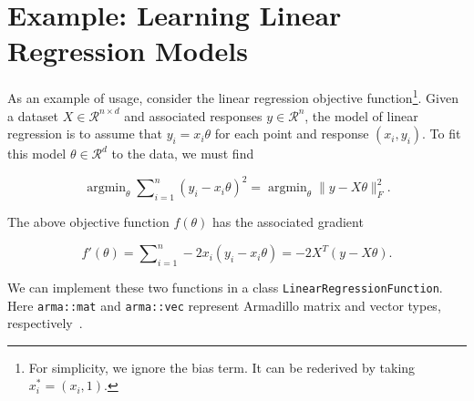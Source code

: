 \documentclass{article}
\begin{document}
\vspace*{-0.3em}
\section{Example: Learning Linear Regression Models}
\label{sec:linreg_example}
\vspace*{-0.5em}

As an example of usage, consider the linear regression objective
function\footnote{For simplicity, we ignore the bias term.  It can be
rederived by taking $x^*_i = (x_i, 1)$.}.  Given a dataset $X \in
\mathcal{R}^{n \times d}$ and associated responses $y \in \mathcal{R}^n$, the
model of linear regression is to assume that $y_i = x_i \theta$ for each
point and response $(x_i, y_i)$.  To fit this model $\theta \in \mathcal{R}^d$
to the data, we must find

\vspace*{-1.1em}
\begin{equation}
\operatorname{argmin}_\theta \sum\nolimits_{i = 1}^n (y_i - x_i \theta)^2 =
\operatorname{argmin}_\theta \| y - X \theta \|_F^2.
\end{equation}
\vspace*{-1.1em}

The above objective function $f(\theta)$ has the associated gradient

\vspace*{-1.1em}
\begin{equation}
f'(\theta) = \sum\nolimits_{i = 1}^n -2 x_i (y_i - x_i \theta) = -2 X^T (y - X \theta).
\end{equation}
\vspace*{-1.1em}

We can implement these two functions in a class {\tt LinearRegressionFunction}.
Here {\tt arma::mat} and {\tt arma::vec} represent Armadillo matrix and vector
types, respectively~\cite{sanderson2016armadillo}.

\end{document}
